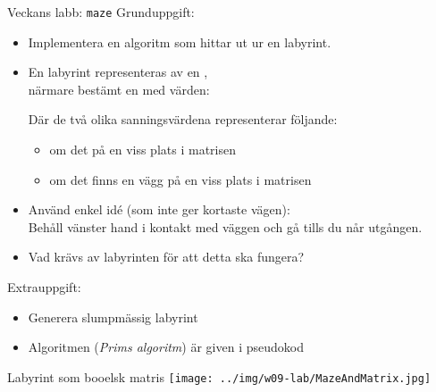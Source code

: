 

\ifkompendium\else

\begin{Slide}{Veckans labb: \texttt{maze}}\SlideFontSmall
Grunduppgift:
\begin{itemize}
\item Implementera en algoritm som hittar ut ur en labyrint.

\item En labyrint representeras av en , \\närmare bestämt en  med   värden: \\  

\pause Där de två olika sanningsvärdena representerar följande:
\begin{itemize}\SlideFontSmall
\item {} om det  på en viss plats i matrisen
\item {} om det  finns en vägg på en viss plats i matrisen 

\end{itemize}
\pause
\item Använd enkel idé (som inte ger kortaste vägen): \\ Behåll vänster hand i kontakt med väggen och gå tills du når utgången.

\item Vad krävs av labyrinten för att detta ska fungera?  
\end{itemize}
\pause Extrauppgift:
\begin{itemize}
\item Generera slumpmässig labyrint 
\item Algoritmen (\emph{Prims algoritm}) är given i pseudokod
\end{itemize}

\end{Slide}

\begin{Slide}{Labyrint som booelsk matris}
\texttt{[image: ../img/w09-lab/MazeAndMatrix.jpg]}
\end{Slide}


